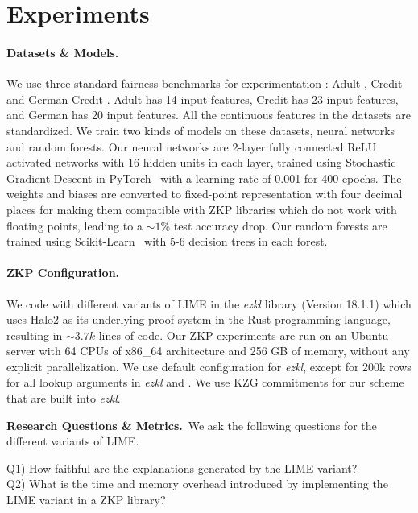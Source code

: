 \section{Experiments}\label{sec:expts}

\paragraph{Datasets \& Models.} We use three standard fairness benchmarks for experimentation : Adult \cite{Adult}, Credit \cite{credit} and German Credit \cite{German}. Adult has 14 input features, Credit has 23 input features, and German has 20 input features. All the continuous features in the datasets are standardized. We train two kinds of models on these datasets, neural networks and random forests. Our neural networks are 2-layer fully connected ReLU activated networks with 16 hidden units in each layer, trained using Stochastic Gradient Descent in PyTorch~\cite{paszke2019pytorch} with a learning rate of 0.001 for 400 epochs. The weights and biases are converted to fixed-point representation with four decimal places for making them compatible with ZKP libraries which do not work with floating points, leading to a $\sim1\%$ test accuracy drop. Our random forests are trained using Scikit-Learn~\cite{pedregosa2011scikit} with 5-6 decision trees in each forest.

\paragraph{ZKP Configuration.} We code \name with different variants of LIME in the \textit{ezkl} library \cite{ezkl2024} (Version 18.1.1) which uses Halo2 \cite{halo2} as its underlying proof system in the Rust programming language, resulting in $\sim 3.7k$ lines of code. Our ZKP experiments are run on an Ubuntu server with 64 CPUs of x86\_64 architecture and 256 GB of memory, without any explicit parallelization. We use default configuration for \textit{ezkl}, except for 200k rows for all lookup arguments in \textit{ezkl} and \name. We use KZG \cite{kate2010constant} commitments for our scheme that are built into \textit{ezkl}.

\textbf{Research Questions \& Metrics.}~We ask the following questions for the different variants of LIME.

Q1) How faithful are the explanations generated by the LIME variant?\\
Q2) What is the time and memory overhead introduced by implementing the LIME variant in a ZKP library?

